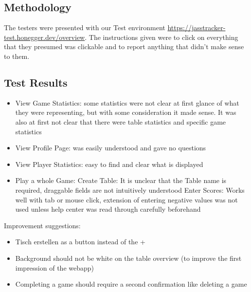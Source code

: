 \subsection{Methodology}
The testers were presented with our Test environment \url{https://jasstracker-test.honegger.dev/overview}.
The instructions given were to click on everything that they presumed was clickable and to report anything that didn't make sense to them. 

\subsection{Test Results}
\begin{itemize}
    \item View Game Statistics: some statistics were not clear at first glance of what they were representing, but with some consideration it made sense. It was also at first not clear that there were table statistics and specific game statistics
    \item View Profile Page: was easily understood and gave no questions
    \item View Player Statistics: easy to find and clear what is displayed 
    \item Play a whole Game:
    \subitem Create Table: It is unclear that the Table name is required, draggable fields are not intuitively understood
    \subitem Enter Scores: Works well with tab or mouse click, extension of entering negative values was not used unless help center was read through carefully beforehand
\end{itemize}
Improvement suggestions: 
\begin{itemize}
    \item Tisch erstellen as a button instead of the +
    \item Background should not be white on the table overview (to improve the first impression of the webapp)
    \item Completing a game should require a second confirmation like deleting a game
\end{itemize}